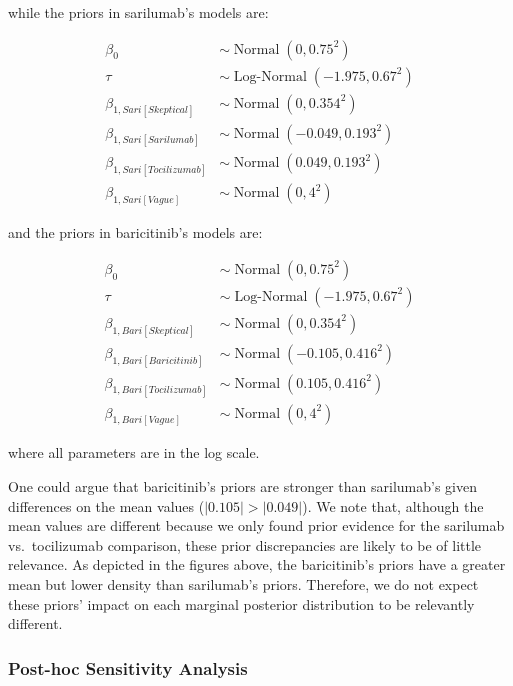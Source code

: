 \documentclass[
  12pt,
]{article}
\begin{document}
while the priors in sarilumab's models are:

\begin{align*}
\beta_0 & \sim \operatorname{Normal}(0, 0.75^2)\\
\tau & \sim \operatorname{Log-Normal}(-1.975, 0.67^2)\\
\beta_{1, Sari[Skeptical]} & \sim \operatorname{Normal}(0, 0.354^2)\\
\beta_{1, Sari[Sarilumab]} & \sim \operatorname{Normal}(-0.049, 0.193^2)\\
\beta_{1, Sari[Tocilizumab]} & \sim \operatorname{Normal}(0.049, 0.193^2)\\
\beta_{1, Sari[Vague]} & \sim \operatorname{Normal}(0, 4^2)
\end{align*}

and the priors in baricitinib's models are:

\begin{align*}
\beta_0 & \sim \operatorname{Normal}(0, 0.75^2)\\
\tau & \sim \operatorname{Log-Normal}(-1.975, 0.67^2)\\
\beta_{1, Bari[Skeptical]} & \sim \operatorname{Normal}(0, 0.354^2)\\
\beta_{1, Bari[Baricitinib]} & \sim \operatorname{Normal}(-0.105, 0.416^2)\\
\beta_{1, Bari[Tocilizumab]} & \sim \operatorname{Normal}(0.105, 0.416^2)\\
\beta_{1, Bari[Vague]} & \sim \operatorname{Normal}(0, 4^2)
\end{align*}

where all parameters are in the log scale.

One could argue that baricitinib's priors are stronger than sarilumab's
given differences on the mean values (\(|0.105| > |0.049|\)). We note
that, although the mean values are different because we only found prior
evidence for the sarilumab vs.~tocilizumab comparison, these prior
discrepancies are likely to be of little relevance. As depicted in the
figures above, the baricitinib's priors have a greater mean but lower
density than sarilumab's priors. Therefore, we do not expect these
priors' impact on each marginal posterior distribution to be relevantly
different.

\newpage

\hypertarget{post-hoc-sensitivity-analysis}{%
\subsubsection{Post-hoc Sensitivity
Analysis}\label{post-hoc-sensitivity-analysis}}
\end{document}
